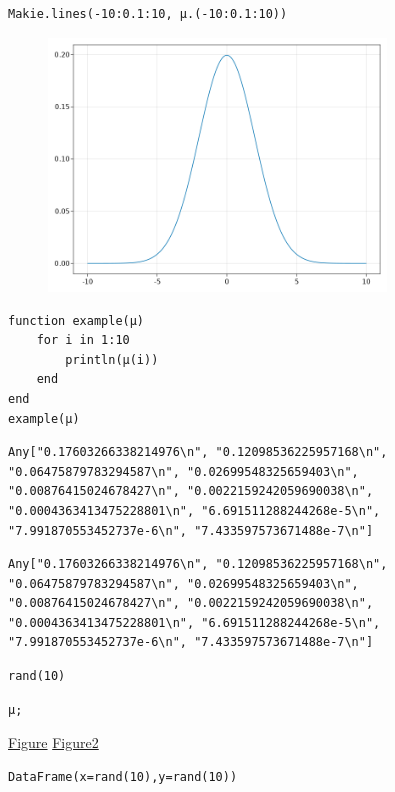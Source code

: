 \begin{lstlisting}[language=JuliaLocal, style=julia]
Makie.lines(-10:0.1:10, μ.(-10:0.1:10))
\end{lstlisting}

\begin{figure}[H]
	\centering
	\includegraphics[width=0.8\textwidth]{./figures/jupyternotebook.i_figure2.png}
	\label{fig:jupyternotebook.i_figure2.png}

\end{figure}

\begin{lstlisting}[language=JuliaLocal, style=julia]
function example(μ)
    for i in 1:10
        println(μ(i))
    end
end
example(μ)
\end{lstlisting}

\begin{verbatim}
Any["0.17603266338214976\n", "0.12098536225957168\n", "0.06475879783294587\n", "0.02699548325659403\n", "0.00876415024678427\n", "0.0022159242059690038\n", "0.0004363413475228801\n", "6.691511288244268e-5\n", "7.991870553452737e-6\n", "7.433597573671488e-7\n"]
\end{verbatim}

\begin{verbatim}
Any["0.17603266338214976\n", "0.12098536225957168\n", "0.06475879783294587\n", "0.02699548325659403\n", "0.00876415024678427\n", "0.0022159242059690038\n", "0.0004363413475228801\n", "6.691511288244268e-5\n", "7.991870553452737e-6\n", "7.433597573671488e-7\n"]
\end{verbatim}

\begin{lstlisting}[language=JuliaLocal, style=julia]
rand(10)
\end{lstlisting}

\begin{lstlisting}[language=JuliaLocal, style=julia]
μ;
\end{lstlisting}
\href{figure.svg}{Figure}  \href{plotexample.png}{Figure2} 
\begin{lstlisting}[language=JuliaLocal, style=julia]
DataFrame(x=rand(10),y=rand(10))
\end{lstlisting}

